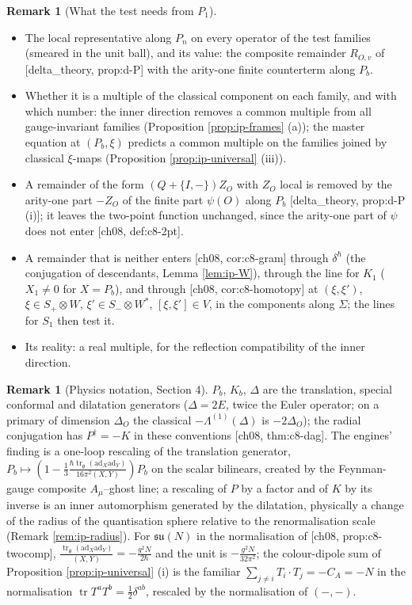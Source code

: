 \documentclass[11pt]{report}
\theoremstyle{plain}
\theoremstyle{definition}
\newtheorem{remark}[theorem]{Remark}
\numberwithin{equation}{chapter}
\newcommand{\unit}{\tfrac{\hbar\operatorname{tr}_{\mathfrak g}(\mathrm{ad}_X\mathrm{ad}_Y)}{16\pi^2(X,Y)}}
\newcommand{\lam}{\tfrac{\operatorname{tr}_{\mathfrak g}(\mathrm{ad}_X\mathrm{ad}_Y)}{(X,Y)}}
\begin{document}
\begin{remark}[What the test needs from $P_1$]
\label{rem:ip-Pneeds}
\begin{itemize}
\item The local representative along $P_n$ on every operator of the test families (smeared in the unit ball), and its value: the composite remainder $R_{O,v}$ of [delta\_theory, prop:d-P] with the arity-one finite counterterm along $P_b$.
\item Whether it is a multiple of the classical component on each family, and with which number: the inner direction removes a common multiple from all gauge-invariant families (Proposition \ref{prop:ip-frames} (a)); the master equation at $(P_b,\xi)$ predicts a common multiple on the families joined by classical $\xi$-maps (Proposition \ref{prop:ip-universal} (iii)).
\item A remainder of the form $(Q+\{I,-\})Z_O$ with $Z_O$ local is removed by the arity-one part $-Z_O$ of the finite part $\psi(O)$ along $P_b$ [delta\_theory, prop:d-P (i)]; it leaves the two-point function unchanged, since the arity-one part of $\psi$ does not enter [ch08, def:c8-2pt].
\item A remainder that is neither enters [ch08, cor:c8-gram] through $\delta^\hbar$ (the conjugation of descendants, Lemma \ref{lem:ip-W}), through the line for $K_1$ ($X_1\neq0$ for $X=P_b$), and through [ch08, cor:c8-homotopy] at $(\xi,\xi')$, $\xi\in S_+\otimes W$, $\xi'\in S_-\otimes W^*$, $[\xi,\xi']\in V$, in the components along $\Sigma$; the lines for $S_1$ then test it.
\item Its reality: a real multiple, for the reflection compatibility of the inner direction.
\end{itemize}
\end{remark}

\begin{remark}[Physics notation, Section 4]
$P_b$, $K_b$, $\Delta$ are the translation, special conformal and dilatation generators ($\Delta=2E$, twice the Euler operator; on a primary of dimension $\Delta_O$ the classical $-\Lambda^{(1)}(\Delta)$ is $-2\Delta_O$); the radial conjugation has $P^\dagger=-K$ in these conventions [ch08, thm:c8-dag]. The engines' finding is a one-loop rescaling of the translation generator, $P_b\mapsto(1-\tfrac13\unit)P_b$ on the scalar bilinears, created by the Feynman-gauge composite $A_\mu$--ghost line; a rescaling of $P$ by a factor and of $K$ by its inverse is an inner automorphism generated by the dilatation, physically a change of the radius of the quantisation sphere relative to the renormalisation scale (Remark \ref{rem:ip-radius}). For $\mathfrak{su}(N)$ in the normalisation of [ch08, prop:c8-twocomp], $\lam=-\tfrac{g^2N}{2\hbar}$ and the unit is $-\tfrac{g^2N}{32\pi^2}$; the colour-dipole sum of Proposition \ref{prop:ip-universal} (i) is the familiar $\sum_{j\neq i}T_i\cdot T_j=-C_A=-N$ in the normalisation $\operatorname{tr}T^aT^b=\tfrac12\delta^{ab}$, rescaled by the normalisation of $(-,-)$.
\end{remark}
\end{document}
